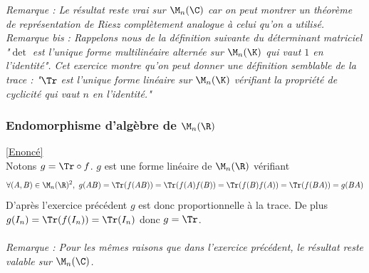 \documentclass[8pt]{book}
\begin{document}
	\textit{Remarque : Le résultat reste vrai sur $\M_n(\C)$ car on peut montrer un théorème de représentation de Riesz complètement analogue à celui qu'on a utilisé.}\\
	\textit{Remarque bis : Rappelons nous de la définition suivante du déterminant matriciel "$\det$ est l'unique forme multilinéaire alternée sur $\M_n(\K)$ qui vaut $1$ en l'identité". Cet exercice montre qu'on peut donner une définition semblable de la trace : "$\Tr$ est l'unique forme linéaire sur $\M_n(\K)$ vérifiant la propriété de cyclicité qui vaut $n$ en l'identité."}
	
	\subsubsection{Endomorphisme d'algèbre de $\M_n(\R)$ }
	\label{Endomorphisme d'algèbre de Mn(R) corrigé}
	\textcolor{blue}{\hyperref[Endomorphisme d'algèbre de Mn(R)]{[Enoncé]}}\\
	Notons $g=\Tr\circ f$. $g$ est une forme linéaire de $\M_n(\R)$ vérifiant $$\forall (A,B)\in \M_n(\R)^2,\ g(AB)=\Tr(f(AB))=\Tr(f(A)f(B))=\Tr(f(B)f(A))=\Tr(f(BA))=g(BA)$$
	D'après l'exercice précédent $g$ est donc proportionnelle à la trace. De plus $g(I_n)=\Tr(f(I_n))=\Tr(I_n)$ donc $g=\Tr$.\\\\
	
	\textit{Remarque : Pour les mêmes raisons que dans l'exercice précédent, le résultat reste valable sur $\M_n(\C)$.}
	
\end{document}
